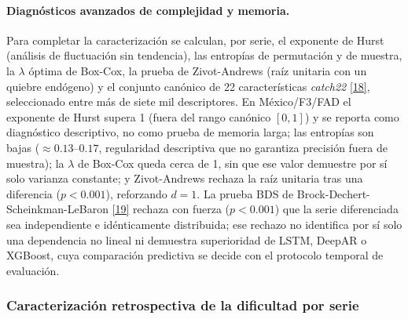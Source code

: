 \documentclass[12pt,letterpaper]{report}
\newcommand{\cita}[1]{\hyperref[bib:#1]{[#1]}}
\begin{document}
\paragraph{Diagnósticos avanzados de complejidad y memoria.} Para completar la
caracterización se calculan, por serie, el exponente de Hurst (análisis de fluctuación sin
tendencia), las entropías de permutación y de muestra, la $\lambda$ óptima de Box-Cox, la prueba
de Zivot-Andrews (raíz unitaria con un quiebre endógeno) y el conjunto canónico de 22
características \textit{catch22} \cita{18}, seleccionado entre más de siete mil descriptores. En
México/F3/FAD el exponente de Hurst supera 1 (fuera del rango canónico $[0,1]$) y se reporta como
diagnóstico descriptivo, no como prueba de memoria larga; las entropías son bajas
($\approx 0.13$--$0.17$, regularidad descriptiva que no garantiza precisión fuera de muestra); la
$\lambda$ de Box-Cox queda cerca de 1, sin que ese valor demuestre por sí solo varianza constante;
y Zivot-Andrews rechaza la raíz unitaria tras una diferencia ($p < 0.001$), reforzando $d=1$. La
prueba BDS de Brock-Dechert-Scheinkman-LeBaron \cita{19} rechaza con fuerza ($p < 0.001$) que la
serie diferenciada sea independiente e idénticamente distribuida; ese rechazo no identifica por sí
solo una dependencia no lineal ni demuestra superioridad de LSTM, DeepAR o XGBoost, cuya
comparación predictiva se decide con el protocolo temporal de evaluación.

\subsubsection{Caracterización retrospectiva de la dificultad por serie}
\end{document}
